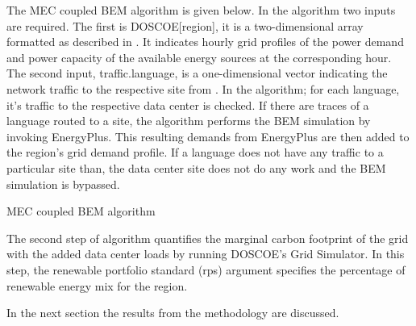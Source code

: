   The MEC coupled BEM algorithm is given below. In the algorithm two inputs are required. The first is DOSCOE[region], it is a two-dimensional array formatted as described in \citep{platt17}. It indicates hourly grid profiles of the power demand and power capacity of the available energy sources at the corresponding hour. The second input, traffic.language, is a one-dimensional vector indicating the network traffic to the respective site from \cite{kumar20b}. In the algorithm; for each language, it’s traffic to the respective data center is checked. If there are traces of a language routed to a site, the algorithm performs the BEM simulation by invoking EnergyPlus. This resulting demands from EnergyPlus are then added to the region’s grid demand profile. If a language does not have any traffic to a particular site than, the data center site does not do any work and the BEM simulation is bypassed.  

  \begin{algorithm}
    \begin{small}
    \caption{MEC coupled BEM algorithm}
    \label{Service Profile}
  \end{small}
  \end{algorithm}

  The second step of algorithm quantifies the marginal carbon footprint of the grid with the added data center loads by running DOSCOE’s Grid Simulator. In this step, the renewable portfolio standard (rps) argument specifies the percentage of renewable energy mix for the region.  

  In the next section the results from the methodology are discussed. 


